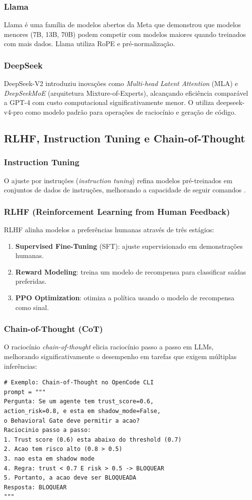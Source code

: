 \subsubsection*{Llama}
Llama \cite{touvron2023llama} é uma família de modelos abertos da Meta que
demonstrou que modelos menores (7B, 13B, 70B) podem competir com modelos
maiores quando treinados com mais dados. Llama utiliza RoPE e
pré-normalização.
\subsubsection*{DeepSeek}
DeepSeek-V2 \cite{deepseek2024deepseek} introduziu inovações como
\textit{Multi-head Latent Attention} (MLA) e \textit{DeepSeekMoE} (arquitetura
Mixture-of-Experts), alcançando eficiência comparável a GPT-4 com custo
computacional significativamente menor. O \opencodeeco{} utiliza
deepseek-v4-pro como modelo padrão para operações de raciocínio e geração
de código.
\subsection{RLHF, Instruction Tuning e Chain-of-Thought}
\subsubsection*{Instruction Tuning}
O ajuste por instruções (\textit{instruction tuning}) refina modelos
pré-treinados em conjuntos de dados de instruções, melhorando a capacidade
de seguir comandos \cite{chung2022scaling}.
\subsubsection*{RLHF (Reinforcement Learning from Human Feedback)}
RLHF \cite{ouyang2022training} alinha modelos a preferências humanas através
de três estágios:
\begin{enumerate}
\item \textbf{Supervised Fine-Tuning} (SFT): ajuste supervisionado em
demonstrações humanas.
\item \textbf{Reward Modeling}: treina um modelo de recompensa para
classificar saídas preferidas.
\item \textbf{PPO Optimization}: otimiza a política usando o modelo de
recompensa como sinal.
\end{enumerate}
\subsubsection*{Chain-of-Thought (CoT)}
O raciocínio \textit{chain-of-thought} \cite{wei2022chain} elicia
raciocínio passo a passo em LLMs, melhorando significativamente o
desempenho em tarefas que exigem múltiplas inferências:
\begin{lstlisting}[style=pythonstyle]
# Exemplo: Chain-of-Thought no OpenCode CLI
prompt = """
Pergunta: Se um agente tem trust_score=0.6,
action_risk=0.8, e esta em shadow_mode=False,
o Behavioral Gate deve permitir a acao?
Raciocinio passo a passo:
1. Trust score (0.6) esta abaixo do threshold (0.7)
2. Acao tem risco alto (0.8 > 0.5)
3. nao esta em shadow mode
4. Regra: trust < 0.7 E risk > 0.5 -> BLOQUEAR
5. Portanto, a acao deve ser BLOQUEADA
Resposta: BLOQUEAR
"""
\end{lstlisting}

